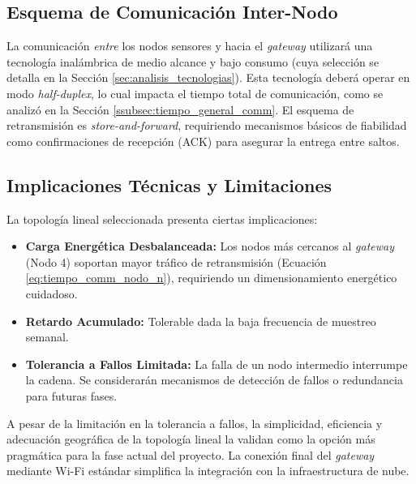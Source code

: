 \subsection{Esquema de Comunicación Inter-Nodo}
\label{subsec:esquema_comunicacion_inter_nodo} 

La comunicación \textit{entre} los nodos sensores y hacia el \textit{gateway} utilizará una tecnología inalámbrica de medio alcance y bajo consumo (cuya selección se detalla en la Sección \ref{sec:analisis_tecnologias}). Esta tecnología deberá operar en modo \textit{half-duplex}, lo cual impacta el tiempo total de comunicación, como se analizó en la Sección \ref{ssubsec:tiempo_general_comm}. El esquema de retransmisión es \textit{store-and-forward}, requiriendo mecanismos básicos de fiabilidad como confirmaciones de recepción (ACK) para asegurar la entrega entre saltos.

\subsection{Implicaciones Técnicas y Limitaciones}
\label{subsec:implicaciones_topologia}

La topología lineal seleccionada presenta ciertas implicaciones:

\begin{itemize}
    \item \textbf{Carga Energética Desbalanceada:} Los nodos más cercanos al \textit{gateway} (Nodo 4) soportan mayor tráfico de retransmisión (Ecuación \eqref{eq:tiempo_comm_nodo_n}), requiriendo un dimensionamiento energético cuidadoso.
    \item \textbf{Retardo Acumulado:} Tolerable dada la baja frecuencia de muestreo semanal.
    \item \textbf{Tolerancia a Fallos Limitada:} La falla de un nodo intermedio interrumpe la cadena. Se considerarán mecanismos de detección de fallos o redundancia para futuras fases.
\end{itemize}

A pesar de la limitación en la tolerancia a fallos, la simplicidad, eficiencia y adecuación geográfica de la topología lineal la validan como la opción más pragmática para la fase actual del proyecto. La conexión final del \textit{gateway} mediante Wi-Fi estándar simplifica la integración con la infraestructura de nube.

